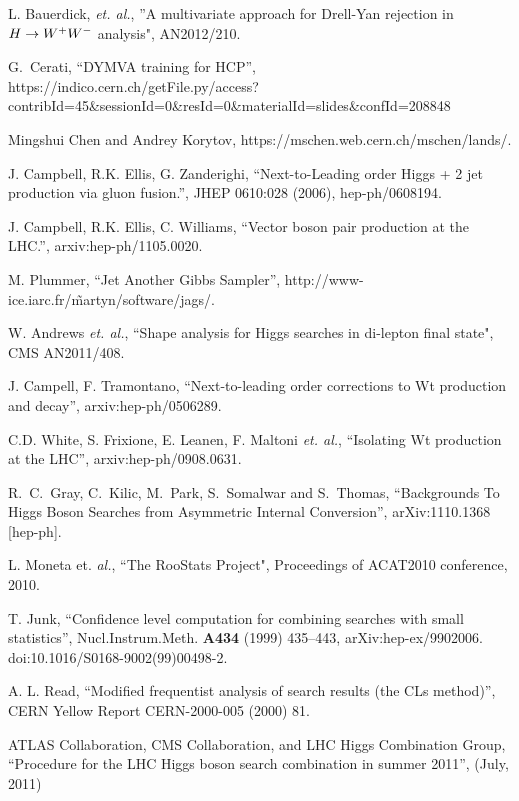 L. Bauerdick, {\it et. al.}, ''A multivariate approach for Drell-Yan rejection in $H\to W^+W^-$ analysis", AN2012/210.

G.~Cerati, ``DYMVA training for HCP'', \\{\small https://indico.cern.ch/getFile.py/access?contribId=45\&sessionId=0\&resId=0\&materialId=slides\&confId=208848}

Mingshui Chen and Andrey Korytov, https://mschen.web.cern.ch/mschen/lands/.

J. Campbell, R.K. Ellis, G. Zanderighi, ``Next-to-Leading order Higgs + 2 jet production via gluon fusion.'', JHEP 0610:028 (2006), hep-ph/0608194.

J. Campbell, R.K. Ellis, C. Williams, ``Vector boson pair production at the LHC.'', arxiv:hep-ph/1105.0020.

M. Plummer, ``Jet Another Gibbs Sampler'', http://www-ice.iarc.fr/\~martyn/software/jags/.

W. Andrews {\it et. al.}, ``Shape analysis for Higgs searches in di-lepton final state", 
CMS AN2011/408.

J. Campell, F. Tramontano, ``Next-to-leading order corrections to Wt production and decay'', arxiv:hep-ph/0506289.

C.D. White, S. Frixione, E. Leanen, F. Maltoni {\it et. al.}, ``Isolating Wt production at the LHC'', arxiv:hep-ph/0908.0631.

  R.~C.~Gray, C.~Kilic, M.~Park, S.~Somalwar and S.~Thomas,
  ``Backgrounds To Higgs Boson Searches from Asymmetric Internal Conversion'',
  arXiv:1110.1368 [hep-ph].

L. Moneta et. {\it al.}, ``The RooStats Project", Proceedings of ACAT2010 conference, 2010.

T. Junk, ``Confidence level computation for combining searches with small statistics'', 
Nucl.Instrum.Meth. {\bf A434} (1999) 435–443, arXiv:hep-ex/9902006. 
doi:10.1016/S0168-9002(99)00498-2.

A. L. Read, ``Modified frequentist analysis of search results (the CLs method)'', 
CERN Yellow Report CERN-2000-005 (2000) 81.

ATLAS Collaboration, CMS Collaboration, and LHC Higgs Combination Group, 
``Procedure for the LHC Higgs boson search combination in summer 2011'', (July, 2011)

